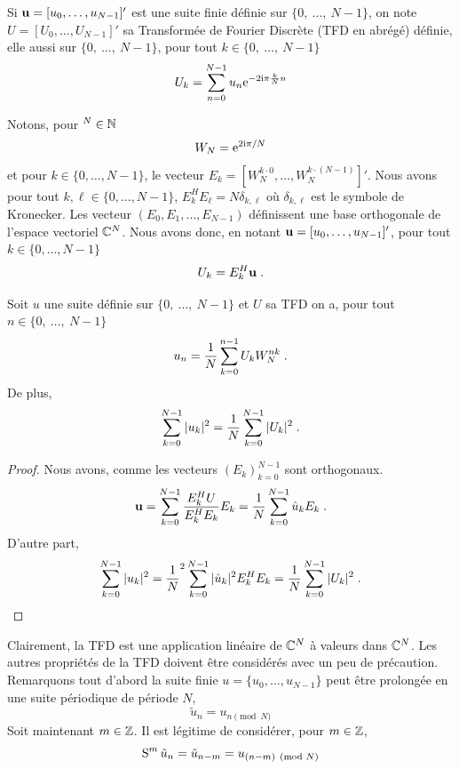 \begin{definition}
Si $\mathbf{u}= [u_0,\dots,u_{N-1}]'$ est une suite finie d\'{e}finie sur $\{0,\ \ldots,\ N-1\}$, on note $U= [U_0,\dots,U_{N-1}]'$  sa Transform\'{e}e de Fourier Discr\`{e}te (TFD en abr\'{e}g\'{e}) d\'{e}finie, elle aussi sur $\{0,\ \ldots,\ N-1\}$, pour tout $k\in\{0,\ \ldots,\ N-1\}$
$$
U_k=\sum_{n=0}^{N-1} u_{n}\mathrm{e}^{-2\mathrm{i}\pi \frac{k}{N}n}
$$
\end{definition}
Notons, pour $^N \in \mathbb{N}$
\begin{equation}
\label{eq:definition-W_N}
W_N= \mathrm{e}^{2 \mathrm{i} \pi /N}
\end{equation}
et pour $k \in \{0,\dots,N-1\}$, le vecteur $E_k= [W_N^{k \cdot 0}, \dots, W_N^{k \cdot (N-1)}]'$.
Nous avons pour tout $k, \ell \in \{0, \dots, N-1\}$, $E_k^H E_\ell= N \delta_{k,\ell}$ où $\delta_{k,\ell}$ est le symbole de Kronecker.
Les vecteur $(E_0,E_1,\dots,E_{N-1})$ définissent une base orthogonale de l'espace vectoriel $\mathbb{C}^N$.
Nous avons donc, en notant $\mathbf{u}= [u_0, \dots, u_{N-1}]'$, pour tout $k \in \{0,\dots,N-1\}$
\[
U_k = E_k^H \mathbf{u} \;.
\]
\begin{theorem}
Soit $u$ une suite d\'{e}finie sur $\{0,\ \ldots,\ N-1\}$ et $U$ sa TFD on a, pour tout $n\in\{0,\ \ldots,\ N-1\}$
$$
u_{n}=\frac{1}{N}\sum_{k=0}^{n-1} U_{k} W_N^{nk}  \;.
$$
De plus,
\[
\sum_{k=0}^{N-1} |u_k|^2 = \frac{1}{N} \sum_{k=0}^{N-1} |U_k|^2 \;.
\]
\end{theorem}
\begin{proof}
Nous avons, comme les vecteurs $(E_k)_{k=0}^{N-1}$ sont orthogonaux.
\[
\mathbf{u} = \sum_{k=0}^{N-1} \frac{E_k^H U}{E_k^H E_k} E_k = \frac{1}{N} \sum_{k=0}^{N-1} \hat{u}_k E_k \;.
\]
D'autre part,
\[
\sum_{k=0}^{N-1} |u_k|^2= \frac{1}{N}^2 \sum_{k=0}^{N-1} |\hat{u}_k|^2 E_k^H E_k= \frac{1}{N} \sum_{k=0}^{N-1} |U_k|^2 \;.
\]
\end{proof}
Clairement, la TFD est une application lin\'eaire de $\mathbb{C}^N$ \`a valeurs dans $\mathbb{C}^N$.
Les autres propri\'et\'es de la TFD doivent être consid\'er\'es avec un peu de pr\'ecaution.
Remarquons tout d'abord la suite finie $u= \{u_0, \dots, u_{N-1}\}$ peut être prolong\'ee en une suite p\'eriodique de
p\'eriode $N$,
\begin{equation}\label{eq:periodisee}
\tilde{u}_n= u_{ n \pmod{N}}
\end{equation}
Soit maintenant $m \in \mathbb{Z}$. Il est l\'egitime de consid\'erer, pour $m \in \mathbb{Z}$,
$$
\operatorname{S}^m \tilde{u}_n = \tilde{u}_{n-m} = u_{ (n-m) \pmod{N} }
$$

